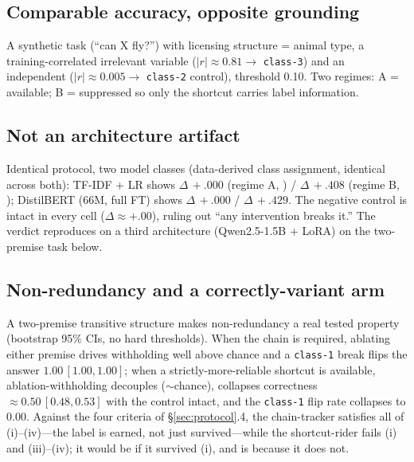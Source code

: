 \subsection{Comparable accuracy, opposite grounding}
A synthetic task (``can X fly?'') with licensing structure \Mstr{} = animal type,
a training-correlated irrelevant variable \col{} ($|r|\approx 0.81 \to$
\texttt{class-3}) and an independent \nam{} ($|r|\approx 0.005 \to$
\texttt{class-2} control), threshold 0.10. Two regimes: A = \Mstr{}
available; B = \Mstr{} suppressed so only the shortcut carries label
information.

\begin{table}[t]
  \centering\small
  \caption{Headline accuracy and the \SC{} fraction are comparably high
  across A and B; the grounding verdict is opposite. Regime B is the
  strict-containment witness for $\scg{} \subsetneq \SC{}$.}
  \label{tab:matched}
\end{table}

\subsection{Not an architecture artifact}
Identical protocol, two model classes (data-derived class assignment, identical
across both): TF-IDF + LR shows $\Delta\,+.000$ (regime A, \scg{}) /
$\Delta\,+.408$ (regime B, \scs{}); DistilBERT (66M, full FT) shows
$\Delta\,+.000$ / $\Delta\,+.429$. The negative control is intact in every cell
($\Delta\approx +.00$), ruling out ``any intervention breaks it.'' The verdict
reproduces on a third architecture (Qwen2.5-1.5B + LoRA) on the two-premise task
below.

\subsection{Non-redundancy and a correctly-variant arm}
A two-premise transitive structure makes non-redundancy a real tested property
(bootstrap 95\% CIs, no hard thresholds). When the chain is required, ablating
either premise drives withholding well above chance and a \texttt{class-1}
break flips the answer $1.00\,[1.00,1.00]$; when a strictly-more-reliable
shortcut is available, ablation-withholding decouples ($\sim$chance), \doc{}
collapses correctness $\approx 0.50\,[0.48,0.53]$ with the control intact, and
the \texttt{class-1} flip rate collapses to $0.00$. Against the four
criteria of \S\ref{sec:protocol}.4, the chain-tracker satisfies all of
(i)--(iv)---the \scg{} label is earned, not just survived---while the
shortcut-rider fails (i) and (iii)--(iv); it would be \scu{} if it survived
(i), and is \scs{} because it does not.

